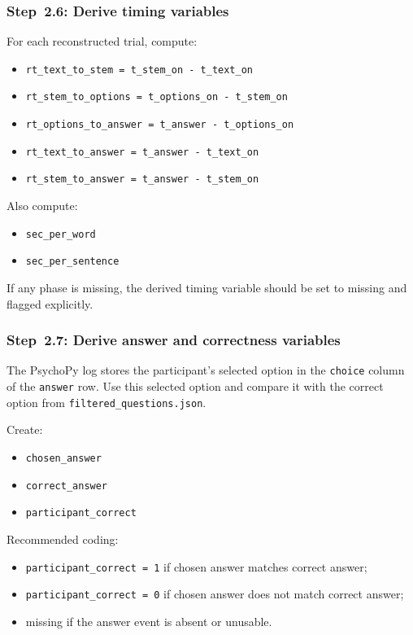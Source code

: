 \documentclass[11pt]{article}
\begin{document}
\subsubsection{Step~2.6: Derive timing variables}
For each reconstructed trial, compute:
\begin{itemize}
    \item \texttt{rt\_text\_to\_stem = t\_stem\_on - t\_text\_on}
    \item \texttt{rt\_stem\_to\_options = t\_options\_on - t\_stem\_on}
    \item \texttt{rt\_options\_to\_answer = t\_answer - t\_options\_on}
    \item \texttt{rt\_text\_to\_answer = t\_answer - t\_text\_on}
    \item \texttt{rt\_stem\_to\_answer = t\_answer - t\_stem\_on}
\end{itemize}

Also compute:
\begin{itemize}
    \item \texttt{sec\_per\_word}
    \item \texttt{sec\_per\_sentence}
\end{itemize}

If any phase is missing, the derived timing variable should be set to missing and flagged explicitly.

\subsubsection{Step~2.7: Derive answer and correctness variables}
The PsychoPy log stores the participant's selected option in the \texttt{choice} column of the \texttt{answer} row.
Use this selected option and compare it with the correct option from \texttt{filtered\_questions.json}.

Create:
\begin{itemize}
    \item \texttt{chosen\_answer}
    \item \texttt{correct\_answer}
    \item \texttt{participant\_correct}
\end{itemize}

Recommended coding:
\begin{itemize}
    \item \texttt{participant\_correct = 1} if chosen answer matches correct answer;
    \item \texttt{participant\_correct = 0} if chosen answer does not match correct answer;
    \item missing if the answer event is absent or unusable.
\end{itemize}
\end{document}
